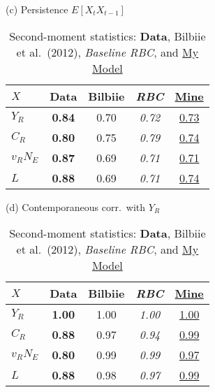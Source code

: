 \documentclass[a4paper,12pt]{article} %
\numberwithin{equation}{section} %
\numberwithin{figure}{section}
\numberwithin{table}{section}
\newcommand{\dat}{\textbf}      %
\newcommand{\rbc}{\emph}        %
\newcommand{\mine}[1]{\underline{#1}}   %
\begin{document}
\begin{refsection}
\begin{appendices}
\begin{table}[htbp]
\begin{subtable}[t]{.48\textwidth}
  \centering
  \caption*{(c) Persistence $E[X_t X_{t-1}]$}
  \begin{tabular}{lcccc}
  \toprule
   $X$ & \dat{Data} & Bilbiie & \rbc{RBC} & \mine{Mine}\\
  \midrule
   $Y_R$      & \dat{0.84} & 0.70 & \rbc{0.72} & \mine{0.73}\\
   $C_R$      & \dat{0.80} & 0.75 & \rbc{0.79} & \mine{0.74}\\
   $v_RN_E$   & \dat{0.87} & 0.69 & \rbc{0.71} & \mine{0.71}\\
   $L$        & \dat{0.88} & 0.69 & \rbc{0.71} & \mine{0.74}\\
  \bottomrule
  \end{tabular}
\end{subtable}
\hfill
\begin{subtable}[t]{.48\textwidth}
  \centering
  \caption*{(d) Contemporaneous corr.\ with $Y_R$}
  \begin{tabular}{lcccc}
  \toprule
   $X$ & \dat{Data} & Bilbiie & \rbc{RBC} & \mine{Mine}\\
  \midrule
   $Y_R$      & \dat{1.00} & 1.00 & \rbc{1.00} & \mine{1.00}\\
   $C_R$      & \dat{0.88} & 0.97 & \rbc{0.94} & \mine{0.99}\\
   $v_RN_E$   & \dat{0.80} & 0.99 & \rbc{0.99} & \mine{0.97}\\
   $L$        & \dat{0.88} & 0.98 & \rbc{0.97} & \mine{0.99}\\
  \bottomrule
  \end{tabular}
\end{subtable}
\caption{Second-moment statistics: \dat{Data}, Bilbiie et al.\ (2012), 
\rbc{Baseline RBC}, and \mine{My Model}}
\end{table}



\newpage
\end{appendices}
\thispagestyle{plain}
\renewcommand*{\thepage}{A-\Roman{page}} %

\printbibliography[heading=subbibliography, title={Appendix References}]
\thispagestyle{plain}
\cleardoublepage %

\end{refsection}
\end{document}
